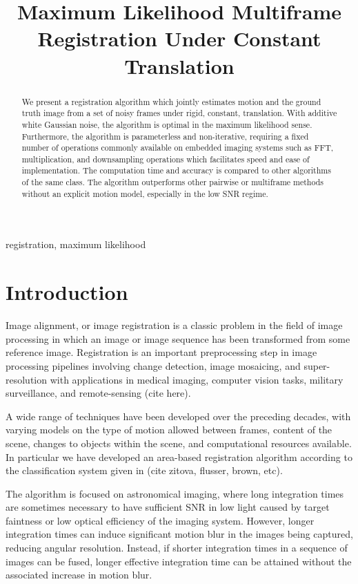 \documentclass{article}
\title{Maximum Likelihood Multiframe Registration Under Constant Translation}
\begin{document}
\maketitle
\begin{abstract}
  We present a registration algorithm which jointly estimates motion and the ground truth image from a set of noisy frames under rigid, constant, translation.  With additive white Gaussian noise, the algorithm is optimal in the maximum likelihood sense.  Furthermore, the algorithm is parameterless and non-iterative, requiring a fixed number of operations commonly available on embedded imaging systems such as FFT, multiplication, and downsampling operations which facilitates speed and ease of implementation.  The computation time and accuracy is compared to other algorithms of the same class.  The algorithm outperforms other pairwise or multiframe methods without an explicit motion model, especially in the low SNR regime.
\end{abstract}
%
\begin{keywords}
  registration, maximum likelihood
\end{keywords}
%
%
\section{Introduction}
\label{sec:introduction}

Image alignment, or image registration is a classic problem in the field of image processing in which an image or image sequence has been transformed from some reference image.
Registration is an important preprocessing step in image processing pipelines involving change detection, image mosaicing, and super-resolution with applications in medical imaging, computer vision tasks, military surveillance, and remote-sensing (cite here).

A wide range of techniques have been developed over the preceding decades, with varying models on the type of motion allowed between frames, content of the scene, changes to objects within the scene, and computational resources available.  In particular we have developed an area-based registration algorithm according to the classification system given in (cite zitova, flusser, brown, etc).

The algorithm is focused on astronomical imaging, where long integration times are sometimes necessary to have sufficient SNR in low light caused by target faintness or low optical efficiency of the imaging system.  However, longer integration times can induce significant motion blur in the images being captured, reducing angular resolution.  Instead, if shorter integration times in a sequence of images can be fused, longer effective integration time can be attained without the associated increase in motion blur.
\end{document}
